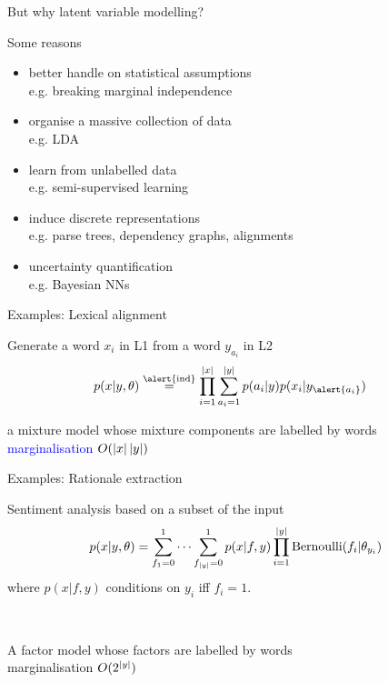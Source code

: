 \documentclass[14pt]{beamer}
\begin{document}
\begin{frame}{But why latent variable modelling?}

Some reasons

\begin{itemize}
	\item better handle on statistical assumptions\\
	e.g. breaking marginal independence \pause
	\item organise a massive collection of data\\
	e.g. LDA	 \pause
	\item learn from unlabelled data\\
	e.g. semi-supervised learning \pause
	\item induce discrete representations\\
	e.g. parse trees, dependency graphs, alignments \pause
	\item uncertainty quantification\\
	e.g. Bayesian NNs 
\end{itemize}

\end{frame}

\begin{frame}{Examples: Lexical alignment}

Generate a word $x_i$ in L1 from a word $y_{a_i}$ in L2 \pause
	\begin{equation*}
	\begin{aligned}
		p(x|y, \theta) %
		&\overset{\text{\alert{ind}}}{=} \prod_{i=1}^{\abs{x}} \sum_{a_i=1}^{\abs{y}}p(a_i|y)p(x_i|y_{\alert{a_i}}) 
		\end{aligned}
	\end{equation*}

\pause

a mixture model whose mixture components are labelled by words \hfill \textcolor{blue}{marginalisation $O(\left|x\right|\left|y\right|)$}

\end{frame}

\begin{frame}{Examples: Rationale extraction}

Sentiment analysis based on a subset of the input \pause
\begin{equation*}
	\begin{aligned}
		p(x|y, \theta) &= \sum_{f_1=0}^{1}\cdots \sum_{f_{\left|y\right|}=0}^{1} p(x|f,y) \prod_{i=1}^{\left|y\right|} \operatorname{Bernoulli}(f_i|\theta_{y_i}) \\
		\end{aligned}
	\end{equation*}
where $p(x|f,y)$ conditions on $y_i$ iff $f_i = 1$.

~ \pause

A factor model whose factors are labelled by words \\
\hfill \alert{marginalisation $O(2^{\left|y\right|})$}

\end{frame}
\end{document}
